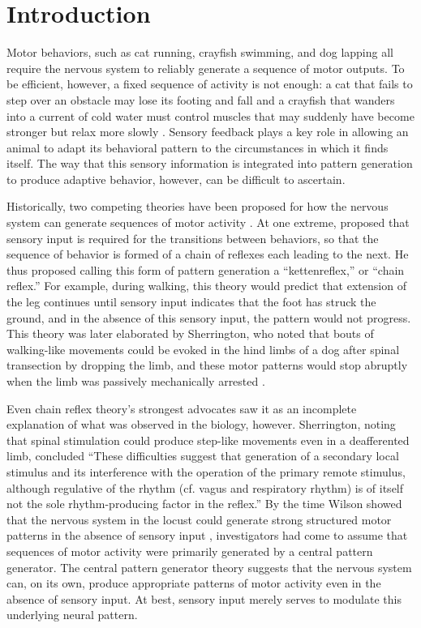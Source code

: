 \newlength\desccolwidth
\newlength\varcolwidth

\section{Introduction}

Motor behaviors, such as cat running, crayfish swimming, and dog lapping all
require the nervous system to reliably generate a sequence of motor outputs.
To be efficient, however, a fixed sequence of activity is not enough: a cat
that fails to step over an obstacle may lose its footing and fall
\citep{forssberg_phase_1975,forssberg_stumbling_1979}
and a crayfish that wanders into a
current of cold water must control muscles that may suddenly have become
stronger but relax more slowly \citep{harri_effects_1977}.  Sensory
feedback plays a key role in allowing an animal to adapt its behavioral pattern
to the circumstances in which it finds itself.  The way that this sensory
information is integrated into pattern generation to produce adaptive behavior,
however, can be difficult to ascertain.

Historically, two competing theories have been proposed for how the nervous
system can generate sequences of motor
activity \citep{marder_central_2001}.  At one extreme,
\citet{loeb_einleitung_1899} proposed that
sensory input is required for the transitions between behaviors, so that the
sequence of behavior is formed of a chain of reflexes each leading to the next.
He thus proposed calling this form of pattern generation a ``kettenreflex,'' or
``chain reflex.''  For example, during walking, this theory would predict that
extension of the leg continues until sensory input indicates that the foot has
struck the ground, and in the absence of this sensory input, the pattern would
not progress.  This theory was later elaborated by Sherrington, who noted that
bouts of walking-like movements could be evoked in the hind limbs of a dog
after spinal transection by dropping the limb, and these motor patterns would
stop abruptly when the limb was passively mechanically arrested
\citep{sherrington_flexion-reflex_1910}.

Even chain reflex theory's strongest advocates saw it as an incomplete
explanation of what was observed in the biology, however.  Sherrington, noting
that spinal stimulation could produce step-like movements even in a
deafferented limb, concluded ``These difficulties suggest that generation of a
secondary local stimulus and its interference with the operation of the primary
remote stimulus, although regulative of the rhythm (cf. vagus and respiratory
rhythm) is of itself not the sole rhythm-producing factor in the reflex.'' By
the time Wilson showed that the nervous system in the locust could generate
strong structured motor patterns in the absence of sensory input
\citep{wilson_central_1961}, investigators had come to assume that sequences of
motor activity were primarily generated by a central pattern generator.  The
central pattern generator theory suggests that the nervous system can, on its
own, produce appropriate patterns of motor activity even in the absence of
sensory input. At best, sensory input merely serves to modulate this underlying
neural pattern.

